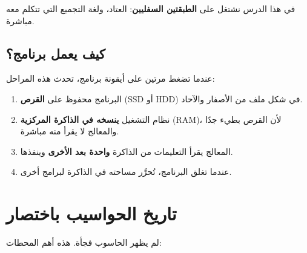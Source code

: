 في هذا الدرس نشتغل على \textbf{الطبقتين السفليين}: العتاد، ولغة التجميع التي تتكلم معه مباشرة.

\subsection{كيف يعمل برنامج؟}
عندما تضغط مرتين على أيقونة برنامج، تحدث هذه المراحل:
\begin{enumerate}
    \item البرنامج محفوظ على \textbf{القرص} (\textenglish{SSD} أو \textenglish{HDD}) في شكل ملف من الأصفار والآحاد.
    \item نظام التشغيل \textbf{ينسخه في الذاكرة المركزية} \textenglish{(RAM)}، لأن القرص بطيء جدًا والمعالج لا يقرأ منه مباشرة.
    \item المعالج يقرأ التعليمات من الذاكرة \textbf{واحدة بعد الأخرى} وينفذها.
    \item عندما تغلق البرنامج، تُحرَّر مساحته في الذاكرة لبرامج أخرى.
\end{enumerate}

\section{تاريخ الحواسيب باختصار}

لم يظهر الحاسوب فجأة. هذه أهم المحطات:

\begin{center}
\end{center}


